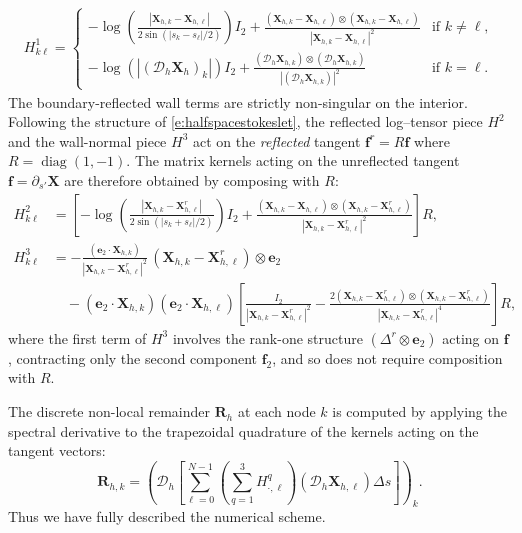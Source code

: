 \documentclass{amsart}
\begin{document}
\begin{align*}
H^1_{k\ell}  = \left\{ \begin{array}{ll} 
- \log\left( \frac{|\mathbf{X}_{h,k} - \mathbf{X}_{h,\ell} |}{2 \sin(|s_k - s_\ell|/2)} \right) I_2 + \frac{ (\mathbf{X}_{h,k} - \mathbf{X}_{h,\ell}) \otimes (\mathbf{X}_{h,k} - \mathbf{X}_{h,\ell}) }{ |\mathbf{X}_{h,k} - \mathbf{X}_{h,\ell}|^2 } & \text{if } k \neq \ell, \\
- \log\left( |(\mathcal{D}_{h} \mathbf{X}_h)_k| \right) I_2 + \frac{ (\mathcal{D}_h \mathbf{X}_{h,k} ) \otimes (\mathcal{D}_h \mathbf{X}_{h,k} ) }{ |(\mathcal{D}_h \mathbf{X}_{h,k} )|^2} & \text{if } k = \ell.
\end{array} \right.
\end{align*}
The boundary-reflected wall terms are strictly non-singular on the interior. Following the structure of \eqref{e:halfspacestokeslet}, the reflected log--tensor piece $H^2$ and the wall-normal piece $H^3$ act on the \emph{reflected} tangent $\mathbf{f}^r=R\mathbf{f}$ where $R=\operatorname{diag}(1,-1)$. The matrix kernels acting on the unreflected tangent $\mathbf{f}=\partial_{s'}\mathbf{X}$ are therefore obtained by composing with $R$:
\begin{align*}
H^2_{k\ell}  &=  \left[-\log\!\left(\frac{|\mathbf{X}_{h,k}-\mathbf{X}^r_{h,\ell}|}{2\sin(|s_k+s_\ell|/2)}\right)I_2 + \frac{(\mathbf{X}_{h,k}-\mathbf{X}_{h,\ell})\otimes(\mathbf{X}_{h,k}-\mathbf{X}^r_{h,\ell})}{|\mathbf{X}_{h,k}-\mathbf{X}^r_{h,\ell}|^2}\right]R, \\
H^3_{k\ell} &= -\frac{(\mathbf{e}_2\cdot\mathbf{X}_{h,k})}{|\mathbf{X}_{h,k}-\mathbf{X}^r_{h,\ell}|^2}\,(\mathbf{X}_{h,k}-\mathbf{X}^r_{h,\ell})\otimes\mathbf{e}_2 \\
&\quad - (\mathbf{e}_2\cdot\mathbf{X}_{h,k})(\mathbf{e}_2\cdot\mathbf{X}_{h,\ell}) \left[\frac{I_2}{|\mathbf{X}_{h,k}-\mathbf{X}^r_{h,\ell}|^2} - \frac{2(\mathbf{X}_{h,k}-\mathbf{X}^r_{h,\ell})\otimes(\mathbf{X}_{h,k}-\mathbf{X}^r_{h,\ell})}{|\mathbf{X}_{h,k}-\mathbf{X}^r_{h,\ell}|^4}\right]R,
\end{align*}
where the first term of $H^3$ involves the rank-one structure $(\Delta^r\otimes\mathbf{e}_2)$ acting on $\mathbf{f}$, contracting only the second component $\mathbf{f}_2$, and so does not require composition with $R$.



The discrete non-local remainder $\mathbf{R}_h$ at each node $k$ is computed by applying the spectral derivative to the trapezoidal quadrature of the kernels acting on the tangent vectors:
\begin{equation}
\mathbf{R}_{h, k} = \left( \mathcal{D}_h \left[ \sum_{\ell=0}^{N-1} \left( \sum_{q=1}^3 H^q_{\cdot, \ell} \right) (\mathcal{D}_h \mathbf{X}_{h, \ell}) \Delta s \right] \right)_k.
\end{equation}
Thus we have fully described the numerical scheme.\\
\end{document}
